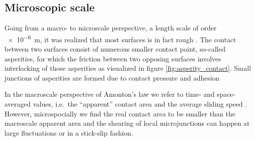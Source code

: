 










\subsection{Microscopic scale}
Going from a macro- to microscale perspective, a length scale of order
\SI{e-6}{m}, it was realized that most surfaces is in fact rough
\cite{mo_friction_2009}. The contact between two surfaces consist of numerous
smaller contact point, so-called asperities, for which the friction between two
opposing surfaces involves interlocking of those asperities as visualized in
figure \ref{fig:asperity_contact}. Small junctions of asperities are formed due
to contact pressure and adhesion \cite{kim_nano-scale_2009}

In the macroscale perspective of Amonton's law we refer to time- and
space-averaged values, i.e.\ the ``apparent'' contact area and the average
sliding speed \cite{gao_frictional_2004}. However, microspocially we find the
real contact area to be smaller than the macroscale apparent area and the
shearing of local microjunctions can happen at large fluctuations or in a
stick-slip fashion. 


